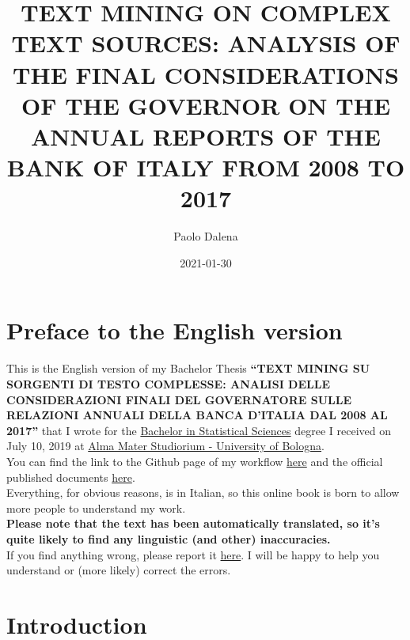 \documentclass[
]{book}
\title{TEXT MINING ON COMPLEX TEXT SOURCES: ANALYSIS OF THE FINAL CONSIDERATIONS OF THE GOVERNOR ON THE ANNUAL REPORTS OF THE BANK OF ITALY FROM 2008 TO 2017}
\author{Paolo Dalena}
\date{2021-01-30}
\begin{document}
\maketitle

{
\setcounter{tocdepth}{1}
\tableofcontents
}
\hypertarget{preface-to-the-english-version}{%
\chapter*{Preface to the English version}\label{preface-to-the-english-version}}

This is the English version of my Bachelor Thesis \textbf{``TEXT MINING SU SORGENTI DI TESTO COMPLESSE: ANALISI DELLE CONSIDERAZIONI FINALI DEL GOVERNATORE SULLE RELAZIONI ANNUALI DELLA BANCA D'ITALIA DAL 2008 AL 2017''} that I wrote for the \href{https://corsi.unibo.it/1cycle/StatisticalSciences}{Bachelor in Statistical Sciences} degree I received on July 10, 2019 at \href{https://www.unibo.it/en/homepage}{Alma Mater Studiorium - University of Bologna}.\\
You can find the link to the Github page of my workflow \href{https://github.com/PaoloDalena/tesi}{here} and the official published documents \href{https://github.com/PaoloDalena/tesi/tree/master/Tesi_docs}{here}.\\
Everything, for obvious reasons, is in Italian, so this online book is born to allow more people to understand my work.\\
\textbf{Please note that the text has been automatically translated, so it's quite likely to find any linguistic (and other) inaccuracies.}\\
If you find anything wrong, please report it \href{https://github.com/PaoloDalena/bachelor_thesis_book/issues}{here}. I will be happy to help you understand or (more likely) correct the errors.

\hypertarget{intro}{%
\chapter{Introduction}\label{intro}}
\end{document}

